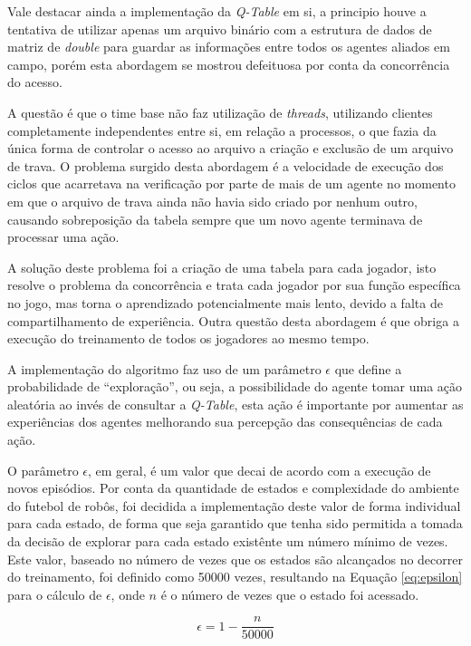 Vale destacar ainda a implementação da \textit{Q-Table} em si, a principio houve
a tentativa de utilizar apenas um arquivo binário com a estrutura de dados de
matriz de \textit{double} para guardar as informações entre todos os agentes
aliados  em campo, porém esta abordagem se mostrou defeituosa por conta da
concorrência do acesso.

A questão é que o time base não faz utilização de \textit{threads}, utilizando
clientes completamente independentes entre si, em relação a processos, o que
fazia da única forma de controlar o acesso ao arquivo a criação e exclusão de
um arquivo de trava. O problema surgido desta abordagem é a velocidade de
execução dos ciclos que acarretava na verificação por parte de mais de um agente
no momento em que o arquivo de trava ainda não havia sido criado por nenhum
outro, causando sobreposição da tabela sempre que um novo agente terminava de
processar uma ação.

A solução deste problema foi a criação de uma tabela para cada jogador, isto
resolve  o problema da concorrência e trata cada jogador por sua função
específica no jogo, mas torna o aprendizado potencialmente mais
lento, devido a falta de compartilhamento de experiência. Outra questão desta
abordagem é que obriga a execução do treinamento de todos os jogadores ao mesmo
tempo.

A implementação do algoritmo faz uso de um parâmetro $\epsilon$ que define a probabilidade
de ``exploração'', ou seja, a possibilidade do agente tomar uma ação aleatória
ao invés de consultar a \textit{Q-Table}, esta ação é importante
por aumentar as experiências dos agentes melhorando sua percepção das
consequências de cada ação. 

O parâmetro $\epsilon$, em geral, é um valor que decai de acordo com a execução
de novos episódios. Por conta da quantidade de estados e complexidade do
ambiente do futebol de robôs, foi decidida a implementação deste valor de forma
individual para cada estado, de forma que seja garantido que tenha sido
permitida a tomada da decisão de explorar para cada estado existênte um número
mínimo de vezes. Este valor, baseado no número de vezes que os estados são
alcançados no decorrer do treinamento, foi definido como 50000 vezes, resultando
na Equação \ref{eq:epsilon} para o cálculo de $\epsilon$, onde $n$ é o número de
vezes que o estado foi acessado.

\begin{equation}
    \label{eq:epsilon}
    \epsilon=1-\frac{n}{50000}    
\end{equation}

